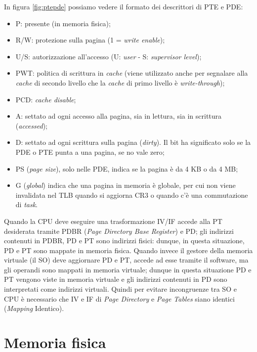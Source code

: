 In figura \ref{fig:ptepde} possiamo vedere il formato dei descrittori di PTE e PDE:
\begin{itemize}
\item P: presente (in memoria fisica);
\item R/W: protezione sulla pagina (1 = \textit{write enable});
\item U/S: autorizzazione all'accesso (U: \textit{user} - S: \textit{supervisor level});
\item PWT: politica di scrittura in \textit{cache} (viene utilizzato anche per segnalare alla \textit{cache}
di secondo livello che la \textit{cache} di primo livello è \textit{write-through});
\item PCD: \textit{cache disable};
\item A: settato ad ogni accesso alla pagina, sia in lettura, sia in scrittura (\textit{accessed});
\item D: settato ad ogni scrittura sulla pagina (\textit{dirty}). Il bit ha significato solo se la
PDE o PTE punta a una pagina, se no vale zero;
\item PS (\textit{page size}), solo nelle PDE, indica se la pagina è da 4 KB o da 4 MB;
\item G (\textit{global}) indica che una pagina in memoria è globale, per cui non viene invalidata
nel TLB quando si aggiorna CR3 o quando c'è una commutazione di \textit{task}.
\end{itemize}

Quando la CPU deve eseguire una trasformazione IV/IF accede alla PT desiderata tramite PDBR (\textit{Page Directory Base Register}) e PD; gli indirizzi contenuti in PDBR, PD e PT sono indirizzi fisici: dunque, in questa situazione, PD e PT sono mappate in memoria fisica. Quando invece il gestore della memoria virtuale (il SO) deve aggiornare PD e PT, accede ad esse tramite il software, ma gli operandi sono mappati in memoria virtuale; dunque in questa situazione PD e PT vengono viste in memoria virtuale e gli indirizzi contenuti in PD sono interpretati come
indirizzi virtuali. Quindi per evitare incongruenze tra SO e CPU è necessario che IV e IF di \textit{Page Directory} e \textit{Page Tables} siano identici (\textit{Mapping} Identico).

\section{Memoria fisica}
\label{sec:memFisica}

